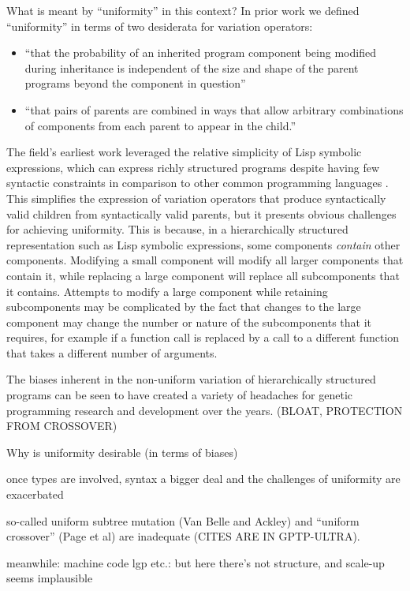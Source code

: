 What is meant by ``uniformity'' in this context? In prior work \cite{GPTP:ULTRA} we defined ``uniformity'' in terms of two desiderata for variation operators:

\begin{itemize}
\item ``that the probability of an inherited program component being modified during inheritance is independent of the size and shape of the parent programs beyond the component in question'' 
\item ``that pairs of parents are combined in ways that allow arbitrary combinations of components from each parent to appear in the child.''
\end{itemize}

The field's earliest work leveraged the relative simplicity of Lisp symbolic expressions, which can express richly structured programs despite having few syntactic constraints in comparison to other common programming languages \cite{koza:book}. This simplifies the expression of variation operators that produce syntactically valid children from syntactically valid parents, but it presents obvious challenges for achieving uniformity. This is because, in a hierarchically structured representation such as Lisp symbolic expressions, some components {\it contain} other components. Modifying a small component will modify all larger components that contain it, while replacing a large component will replace all subcomponents that it contains. Attempts to modify a large component while retaining subcomponents may be complicated by the fact that changes to the large component may change the number or nature of the subcomponents that it requires, for example if a function call is replaced by a call to a different function that takes a different number of arguments.

The biases inherent in the non-uniform variation of hierarchically structured programs can be seen to have created a variety of headaches for genetic programming research and development over the years. (BLOAT, PROTECTION FROM CROSSOVER)

Why is uniformity desirable (in terms of biases)

once types are involved, syntax a bigger deal and the challenges of uniformity are exacerbated

so-called uniform subtree mutation (Van Belle and Ackley) and ``uniform crossover'' (Page et al) are inadequate (CITES ARE IN GPTP-ULTRA).

meanwhile: machine code lgp etc.: but here there's not structure, and scale-up seems implausible

